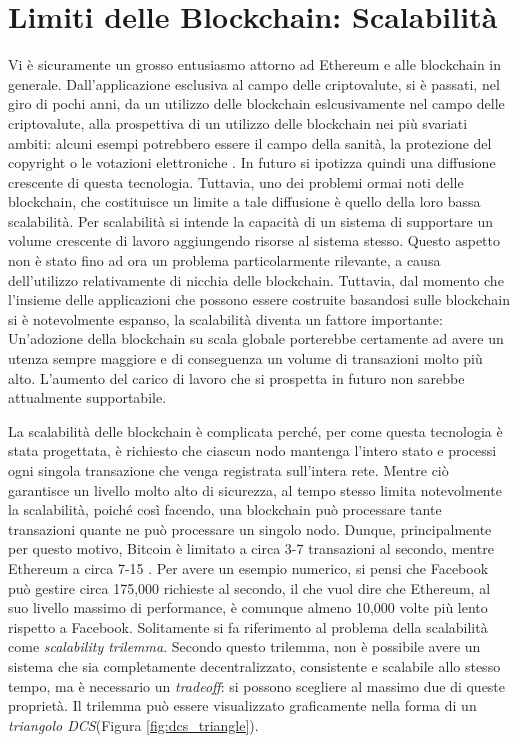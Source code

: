 \section{Limiti delle Blockchain: Scalabilità}

Vi è sicuramente un grosso entusiasmo attorno ad Ethereum e alle blockchain in generale. Dall'applicazione esclusiva al campo delle criptovalute, si è passati, nel giro di pochi anni, da un utilizzo delle blockchain eslcusivamente nel campo delle criptovalute, alla prospettiva di un utilizzo delle blockchain nei più svariati ambiti: alcuni esempi potrebbero essere il campo della sanità, la protezione del copyright o le votazioni elettroniche \cite{K14}. In futuro si ipotizza quindi una diffusione crescente di questa tecnologia. Tuttavia, uno dei problemi ormai noti delle blockchain, che costituisce un limite a tale diffusione è quello della loro bassa scalabilità. Per scalabilità si intende la capacità di un sistema di supportare un volume crescente di lavoro aggiungendo risorse al sistema stesso. Questo aspetto non è stato fino ad ora un problema particolarmente rilevante, a causa dell'utilizzo relativamente di nicchia delle blockchain. Tuttavia, dal momento che l'insieme delle applicazioni che possono essere costruite basandosi sulle blockchain si è notevolmente espanso, la scalabilità diventa un fattore importante: Un'adozione della blockchain su scala globale porterebbe certamente ad avere un utenza sempre maggiore e di conseguenza un volume di transazioni molto più alto. L'aumento del carico di lavoro che si prospetta in futuro non sarebbe attualmente supportabile.

La scalabilità delle blockchain è complicata perché, per come questa tecnologia è stata progettata, è richiesto che ciascun nodo mantenga l'intero stato e processi ogni singola transazione che venga registrata sull'intera rete. Mentre ciò garantisce un livello molto alto di sicurezza, al tempo stesso limita notevolmente la scalabilità, poiché così facendo, una blockchain può processare tante transazioni quante ne può processare un singolo nodo. Dunque, principalmente per questo motivo, Bitcoin è limitato a circa 3-7 transazioni al secondo, mentre Ethereum a circa 7-15 \cite{K16}. Per avere un esempio numerico, si pensi che Facebook può gestire circa 175,000 richieste al secondo, il che vuol dire che Ethereum, al suo livello massimo di performance, è comunque almeno 10,000 volte più lento rispetto a Facebook. 
Solitamente si fa riferimento al problema della scalabilità come \textit{scalability trilemma}. Secondo questo trilemma, non è possibile avere un sistema che sia completamente decentralizzato, consistente e scalabile allo stesso tempo, ma è necessario un \textit{tradeoff}: si possono scegliere al massimo due di queste proprietà. Il trilemma può essere visualizzato graficamente nella forma di un \textit{triangolo DCS}\cite{K16, K17}(Figura \ref{fig:dcs_triangle}).

